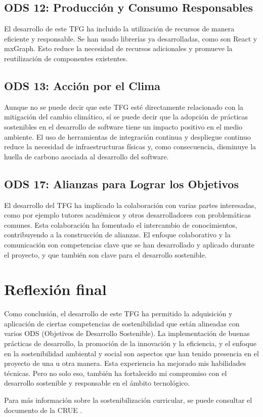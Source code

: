 \subsection{ODS 12: Producción y Consumo Responsables}
El desarrollo de este TFG ha incluido la utilización de recursos de manera eficiente y responsable. Se han usado librerías ya desarrolladas, como son React y mxGraph. Esto reduce la necesidad de recursos adicionales y promueve la reutilización de componentes existentes.

\subsection{ODS 13: Acción por el Clima}
Aunque no se puede decir que este TFG esté directamente relacionado con la mitigación del cambio climático, sí se puede decir que la adopción de prácticas sostenibles en el desarrollo de software tiene un impacto positivo en el medio ambiente.
El uso de herramientas de integración continua y despliegue continuo reduce la necesidad de infraestructuras físicas y, como consecuencia, disminuye la huella de carbono asociada al desarrollo del software.

\subsection{ODS 17: Alianzas para Lograr los Objetivos}
El desarrollo del TFG ha implicado la colaboración con varias partes interesadas, como por ejemplo tutores académicos y otros desarrolladores con problemáticas comunes. Esta colaboración ha fomentado el intercambio de conocimientos, contribuyendo a la construcción de alianzas. El enfoque colaborativo y la comunicación son competencias clave que se han desarrollado y aplicado durante el proyecto, y que también son clave para el desarrollo sostenible.

\section{Reflexión final}
Como conclusión, el desarrollo de este TFG ha permitido la adquisición y aplicación de ciertas competencias de sostenibilidad que están alineadas con varios ODS (Objetivos de Desarrollo Sostenible). 
La implementación de buenas prácticas de desarrollo, la promoción de la innovación y la eficiencia, y el enfoque en la sostenibilidad ambiental y social son aspectos que han tenido presencia en el proyecto de una u otra manera. 
Esta experiencia ha mejorado mis habilidades técnicas. Pero no solo eso, también ha fortalecido mi compromiso con el desarrollo sostenible y responsable en el ámbito tecnológico.

Para más información sobre la sostenibilización curricular, se puede consultar el documento de la CRUE \cite{crue:sostenibilizacion}.

